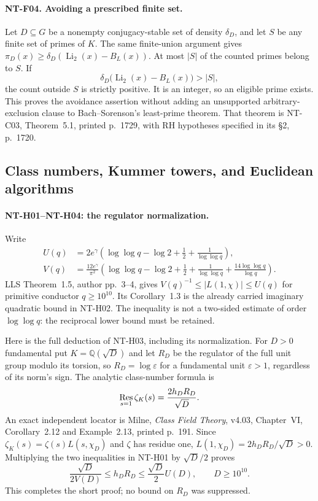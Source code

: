 \documentclass[11pt,a4paper]{article}
\begin{document}
\paragraph{NT-F04. Avoiding a prescribed finite set.}
Let $D\subseteq G$ be a nonempty conjugacy-stable set of density
$\delta_D$, and let $S$ be any finite set of primes of $K$.  The same
finite-union argument gives
$\pi_D(x)\ge\delta_D(\operatorname{Li}_2(x)-B_L(x))$.
At most $|S|$ of the counted primes belong to $S$.  If
\[
 \delta_D\bigl(\operatorname{Li}_2(x)-B_L(x)\bigr)>|S|,
\]
the count outside $S$ is strictly positive.  It is an integer, so an
eligible prime exists.  This proves the avoidance assertion without adding
an unsupported arbitrary-exclusion clause to Bach--Sorenson's least-prime
theorem.  That theorem is NT-C03, Theorem~5.1, printed p.~1729, with
RH hypotheses specified in its \S2, p.~1720.

\subsection{Class numbers, Kummer towers, and Euclidean algorithms}

\paragraph{NT-H01--NT-H04: the regulator normalization.}
Write
\begin{align*}
 U(q)&=2e^\gamma\left(\log\log q-\log2+\tfrac12+
                                      \frac1{\log\log q}\right),\\
 V(q)&=\frac{12e^\gamma}{\pi^2}\left(\log\log q-\log2+\tfrac12+
                   \frac1{\log\log q}+\frac{14\log\log q}{\log q}\right).
\end{align*}
LLS Theorem~1.5, author pp.~3--4, gives
$V(q)^{-1}\le|L(1,\chi)|\le U(q)$ for primitive conductor
$q\ge10^{10}$.  Its Corollary~1.3 is the already carried imaginary
quadratic bound in NT-H02.  The inequality is not a two-sided estimate of
order $\log\log q$: the reciprocal lower bound must be retained.

Here is the full deduction of NT-H03, including its normalization.
For $D>0$ fundamental put $K=\mathbb Q(\sqrt D)$ and let $R_D$ be the
regulator of the full unit group modulo its torsion, so
$R_D=\log\varepsilon$ for a fundamental unit $\varepsilon>1$, regardless
of its norm's sign.  The analytic class-number formula is
\[
 \mathop{\rm Res}_{s=1}\zeta_K(s)=\frac{2h_DR_D}{\sqrt D}.
\]
An exact independent locator is Milne, \emph{Class Field Theory}, v4.03,
Chapter~VI, Corollary~2.12 and Example~2.13, printed p.~191.
Since $\zeta_K(s)=\zeta(s)L(s,\chi_D)$ and $\zeta$ has residue one,
$L(1,\chi_D)=2h_DR_D/\sqrt D>0$.
Multiplying the two inequalities in NT-H01 by $\sqrt D/2$ proves
\[
 \frac{\sqrt D}{2V(D)}\le h_DR_D\le\frac{\sqrt D}{2}U(D),
 \qquad D\ge10^{10}.
\]
This completes the short proof; no bound on $R_D$ was suppressed.
\end{document}
